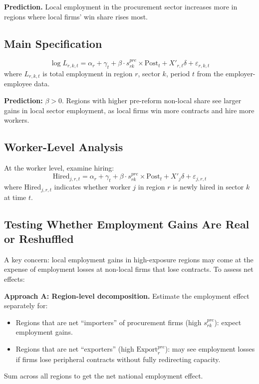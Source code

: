\documentclass[12pt]{article}
\begin{document}
\textbf{Prediction.} Local employment in the procurement sector increases more in regions where local firms' win share rises most.

\subsection{Main Specification}

\begin{equation}\label{eq:employment}
    \log L_{r,k,t} = \alpha_r + \gamma_t + \beta \cdot s_{rk}^{pre} \times \text{Post}_t + X'_{r,t}\delta + \varepsilon_{r,k,t}
\end{equation}
where $L_{r,k,t}$ is total employment in region $r$, sector $k$, period $t$ from the employer-employee data.

\textbf{Prediction:} $\beta > 0$. Regions with higher pre-reform non-local share see larger gains in local sector employment, as local firms win more contracts and hire more workers.

\subsection{Worker-Level Analysis}

At the worker level, examine hiring:
\begin{equation}\label{eq:hiring}
    \text{Hired}_{j,r,t} = \alpha_r + \gamma_t + \beta \cdot s_{rk}^{pre} \times \text{Post}_t + X'_{j}\delta + \varepsilon_{j,r,t}
\end{equation}
where $\text{Hired}_{j,r,t}$ indicates whether worker $j$ in region $r$ is newly hired in sector $k$ at time $t$.

\subsection{Testing Whether Employment Gains Are Real or Reshuffled}

A key concern: local employment gains in high-exposure regions may come at the expense of employment losses at non-local firms that lose contracts. To assess net effects:

\medskip
\noindent \textbf{Approach A: Region-level decomposition.} Estimate the employment effect separately for:
\begin{itemize}[itemsep=2pt]
    \item Regions that are net ``importers'' of procurement firms (high $s_{rk}^{pre}$): expect employment gains.
    \item Regions that are net ``exporters'' (high $\text{Export}_r^{pre}$): may see employment losses if firms lose peripheral contracts without fully redirecting capacity.
\end{itemize}
Sum across all regions to get the net national employment effect.
\end{document}
